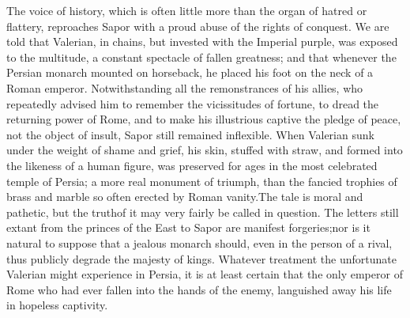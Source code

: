 



The voice of history, which is often little more than the organ
of hatred or flattery, reproaches Sapor with a proud abuse of the
rights of conquest. We are told that Valerian, in chains, but
invested with the Imperial purple, was exposed to the multitude,
a constant spectacle of fallen greatness; and that whenever the
Persian monarch mounted on horseback, he placed his foot on the
neck of a Roman emperor. Notwithstanding all the remonstrances of
his allies, who repeatedly advised him to remember the
vicissitudes of fortune, to dread the returning power of Rome,
and to make his illustrious captive the pledge of peace, not the
object of insult, Sapor still remained inflexible. When Valerian
sunk under the weight of shame and grief, his skin, stuffed with
straw, and formed into the likeness of a human figure, was
preserved for ages in the most celebrated temple of Persia; a
more real monument of triumph, than the fancied trophies of brass
and marble so often erected by Roman vanity.\footnotemark[150] The tale is
moral and pathetic, but the truth\footnotemark[1501] of it may very fairly be
called in question. The letters still extant from the princes of
the East to Sapor are manifest forgeries;\footnotemark[151] nor is it natural
to suppose that a jealous monarch should, even in the person of a
rival, thus publicly degrade the majesty of kings. Whatever
treatment the unfortunate Valerian might experience in Persia, it
is at least certain that the only emperor of Rome who had ever
fallen into the hands of the enemy, languished away his life in
hopeless captivity.


